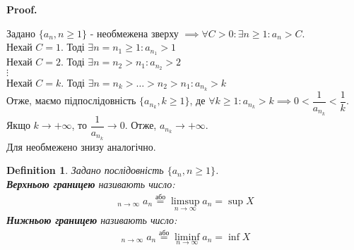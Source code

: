 \documentclass[a4paper, 14pt]{article}
\makeatletter
\DeclareMathOperator*\uplim{\overline{lim}}
\DeclareMathOperator*\downlim{\underline{lim}}
\def\qed{$\blacksquare$}
\theoremstyle{theoremdd}
\theoremstyle{theoremdd}
\newtheorem{definition}[theorem]{Definition}
\theoremstyle{theoremdd}
\theoremstyle{theoremdd}
\theoremstyle{theoremdd}
\theoremstyle{theoremdd}
\theoremstyle{theoremdd}
\theoremstyle{theoremdd}
\renewenvironment{proof}[1][Proof.\\]{\par
\pushQED{\hfill \qed}%
\normalfont \topsep6\p@\@plus6\p@\relax
\trivlist
\item\relax
{\bfseries
#1\@addpunct{.}}\hspace\labelsep\ignorespaces
}{%
\popQED\endtrivlist\@endpefalse
}
\makeatother
\begin{document}
	\begin{proof}
	Задано $\{a_n, n \geq 1\}$ - необмежена зверху $\implies \forall C > 0: \exists n \geq 1: a_n > C$.\\
	Нехай $C = 1$. Тоді $\exists n = n_1 \geq 1: a_{n_1} > 1$\\
	Нехай $C = 2$. Тоді $\exists n = n_2 > n_1: a_{n_2} > 2$\\
	$\vdots$\\
	Нехай $C = k$. Тоді $\exists n = n_k > \dots > n_2 > n_1: a_{n_k} > k$\\
	Отже, маємо підпослідовність $\{a_{n_k}, k \geq 1\}$, де $\forall k \geq 1: a_{n_k} > k \implies 0 <\dfrac{1}{a_{n_k}} < \dfrac{1}{k}$.\\
	Якщо $k \to +\infty$, то $\dfrac{1}{a_{n_k}} \to 0$. Отже, $a_{n_k} \to +\infty$.\bigskip \\
	Для необмежено знизу аналогічно.
	\end{proof}
	
	\begin{definition} Задано послідовність $\{a_n, n \geq 1\}$.\\
	\textbf{Верхньою границею} називають число:
	\begin{align*}
	\displaystyle \uplim_{n \to \infty} a_n \overset{\textrm{або}}{=} \limsup_{n \to \infty} a_n = \sup X
	\end{align*}
	\textbf{Нижньою границею} називають число:
	\begin{align*}
	\displaystyle \downlim_{n \to \infty} a_n \overset{\textrm{або}}{=} \liminf_{n \to \infty} a_n = \inf X
	\end{align*}
	\end{definition}
	
\end{document}

